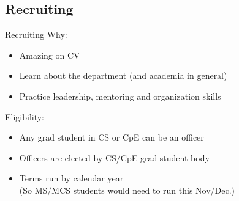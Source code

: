 \documentclass[aspectratio=169]{beamer}
\begin{document}
\subsection{Recruiting}
\begin{frame}{Recruiting}
Why:
\begin{itemize}
    \item Amazing on CV
    \item Learn about the department (and academia in general)
    \item Practice leadership, mentoring and organization skills
\end{itemize}
Eligibility:
\begin{itemize}
    \item Any grad student in CS or CpE can be an officer
    \item Officers are elected by CS/CpE grad student body 
    \item Terms run by calendar year
    \\ (So MS/MCS students would need to run this Nov/Dec.)
\end{itemize}
\end{frame}
\end{document}
